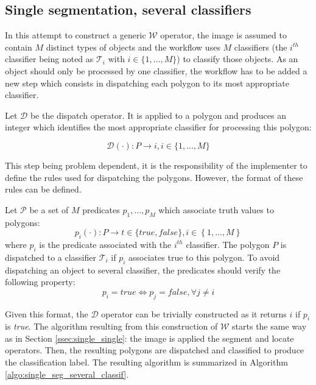 \subsection{Single segmentation, several classifiers}
\label{ssec:single_several}

In this attempt to construct a generic $\mathcal{W}$ operator, the image is assumed to contain $M$ distinct types of objects and the workflow uses $M$ classifiers (the $i^{th}$ classifier being noted as $\mathcal{T}_i$ with $i \in \{1,...,M\}$) to classify those objects. As an object should only be processed by one classifier, the workflow has to be added a new step which consists in dispatching each polygon to its most appropriate classifier. 

\begin{definition}\label{def:dispatch_op} 
	Let $\mathcal{D}$ be the dispatch operator. It is applied to a polygon and produces an integer which identifies the most appropriate classifier for processing this polygon: 

	\begin{equation}
		\mathcal{D}(\cdot) : P \rightarrow i, i \in \{1,...,M\}
	\end{equation}
\end{definition}

This step being problem dependent, it is the responsibility of the implementer to define the rules used for dispatching the polygons. However, the format of these rules can be defined.

\begin{definition} 
	Let $\mathcal{P}$ be a set of $M$ predicates $p_1, ..., p_M$ which associate truth values to polygons:
	\begin{equation}
		p_i(\cdot) : P \rightarrow t \in \{true, false\}, i \in \left\{1,...,M\right\} 
	\end{equation}
	where $p_i$ is the predicate associated with the $i^{th}$ classifier. The polygon $P$ is dispatched to a classifier $\mathcal{T}_i$ if $p_i$ associates true to this polygon. To avoid dispatching an object to several classifier, the predicates should verify the following property:
	\begin{equation}
		p_i = true \Leftrightarrow p_j = false, \forall j \neq i
	\end{equation} 
\end{definition}

Given this format, the $\mathcal{D}$ operator can be trivially constructed as it returns $i$ if $p_i$ is \textit{true}. The algorithm resulting from this construction of $\mathcal{W}$ starts the same way as in Section \ref{ssec:single_single}: the image is applied the segment and locate operators. Then, the resulting polygons are dispatched and classified to produce the classification label. The resulting algorithm is summarized in Algorithm \ref{algo:single_seg_several_classif}. 

